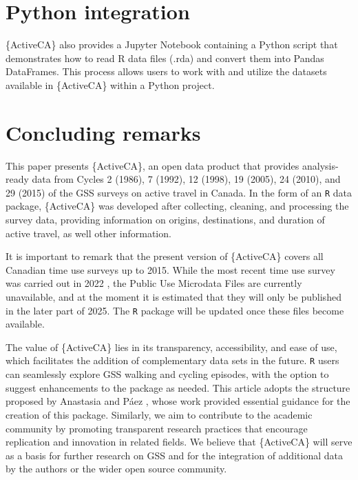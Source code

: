 \documentclass[Royal,times,sageh]{sagej}
\begin{document}
\section{Python integration}\label{python-integration}

\{ActiveCA\} also provides a Jupyter Notebook containing a Python script
that demonstrates how to read R data files (.rda) and convert them into
Pandas DataFrames. This process allows users to work with and utilize
the datasets available in \{ActiveCA\} within a Python project.

\section{Concluding remarks}\label{concluding-remarks}

This paper presents \{ActiveCA\}, an open data product that provides
analysis-ready data from Cycles 2 (1986), 7 (1992), 12 (1998), 19
(2005), 24 (2010), and 29 (2015) of the GSS surveys on active travel in
Canada. In the form of an \texttt{R} data package, \{ActiveCA\} was
developed after collecting, cleaning, and processing the survey data,
providing information on origins, destinations, and duration of active
travel, as well other information.

It is important to remark that the present version of \{ActiveCA\}
covers all Canadian time use surveys up to 2015. While the most recent
time use survey was carried out in 2022 \citep{wray2024}, the Public Use
Microdata Files are currently unavailable, and at the moment it is
estimated that they will only be published in the later part of 2025.
The \texttt{R} package will be updated once these files become
available.

The value of \{ActiveCA\} lies in its transparency, accessibility, and
ease of use, which facilitates the addition of complementary data sets
in the future. \texttt{R} users can seamlessly explore GSS walking and
cycling episodes, with the option to suggest enhancements to the package
as needed. This article adopts the structure proposed by Anastasia and
Páez \citeyearpar{soukhov2023}, whose work provided essential guidance
for the creation of this package. Similarly, we aim to contribute to the
academic community by promoting transparent research practices that
encourage replication and innovation in related fields. We believe that
\{ActiveCA\} will serve as a basis for further research on GSS and for
the integration of additional data by the authors or the wider open
source community.
\end{document}
